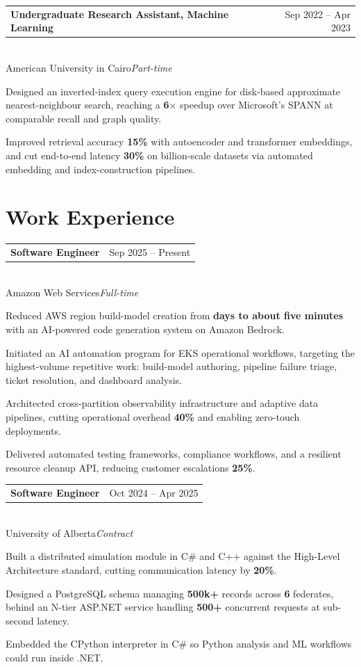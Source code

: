 \documentclass[10pt,a4paper]{article}
\makeatletter
\newcommand{\role}[4]{%
  \vspace{3pt}
  \noindent\begin{tabularx}{\textwidth}{@{}Xr@{}}
    \textbf{#1} & \textcolor{muted}{\small #4}
  \end{tabularx}\\[1pt]
  \textcolor{accent}{#2}\;\textcolor{muted}{\small\textit{#3}}\vspace{2pt}
}
\makeatother
\begin{document}
\role{Undergraduate Research Assistant, Machine Learning}{American University in Cairo}{Part-time}{Sep 2022 -- Apr 2023}
\begin{pts}
  \item Designed an inverted-index query execution engine for disk-based approximate nearest-neighbour search, reaching a \textbf{6$\times$} speedup over Microsoft's SPANN at comparable recall and graph quality.
  \item Improved retrieval accuracy \textbf{15\%} with autoencoder and transformer embeddings, and cut end-to-end latency \textbf{30\%} on billion-scale datasets via automated embedding and index-construction pipelines.
\end{pts}

\section{Work Experience}

\role{Software Engineer}{Amazon Web Services}{Full-time}{Sep 2025 -- Present}
\begin{pts}
  \item Reduced AWS region build-model creation from \textbf{days to about five minutes} with an AI-powered code generation system on Amazon Bedrock.
  \item Initiated an AI automation program for EKS operational workflows, targeting the highest-volume repetitive work: build-model authoring, pipeline failure triage, ticket resolution, and dashboard analysis.
  \item Architected cross-partition observability infrastructure and adaptive data pipelines, cutting operational overhead \textbf{40\%} and enabling zero-touch deployments.
  \item Delivered automated testing frameworks, compliance workflows, and a resilient resource cleanup API, reducing customer escalations \textbf{25\%}.
\end{pts}

\role{Software Engineer}{University of Alberta}{Contract}{Oct 2024 -- Apr 2025}
\begin{pts}
  \item Built a distributed simulation module in C\# and C++ against the High-Level Architecture standard, cutting communication latency by \textbf{20\%}.
  \item Designed a PostgreSQL schema managing \textbf{500k+} records across \textbf{6} federates, behind an N-tier ASP.NET service handling \textbf{500+} concurrent requests at sub-second latency.
  \item Embedded the CPython interpreter in C\# so Python analysis and ML workflows could run inside .NET.
\end{pts}
\end{document}
